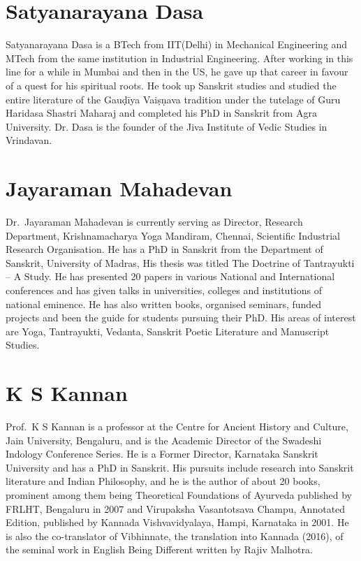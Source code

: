 \section*{Satyanarayana Dasa}

Satyanarayana Dasa is a BTech from IIT(Delhi) in Mechanical Engineering and MTech from the same institution in Industrial Engineering. After working in this line for a while in Mumbai and then in the US, he gave up that career in favour of a quest for his spiritual roots. He took up Sanskrit studies and studied the entire literature of the Gauḍīya Vaiṣṇava tradition under the tutelage of Guru Haridasa Shastri Maharaj and completed his PhD in Sanskrit from Agra University. Dr. Dasa is the founder of the Jiva Institute of Vedic Studies in Vrindavan. 

\section*{Jayaraman Mahadevan}

Dr.~Jayaraman Mahadevan is currently serving as Director, Research Department, Krishnamacharya Yoga Mandiram, Chennai, Scientific Industrial Research Organisation. He has a PhD in Sanskrit from the Department of Sanskrit, University of Madras, His thesis was titled The Doctrine of Tantrayukti – A Study. He has presented 20 papers in various National and International conferences and has given talks in universities, colleges and institutions of national eminence. He has also written books, organised seminars, funded projects and been the guide for students pursuing their PhD. His areas of interest are Yoga, Tantrayukti, Vedanta, Sanskrit Poetic Literature and Manuscript Studies.

\newpage


\section*{K S Kannan}

Prof.~K S Kannan is a professor at the Centre for Ancient History and Culture, Jain University, Bengaluru, and is the Academic Director of the Swadeshi Indology Conference Series. He is a Former Director, Karnataka Sanskrit University and has a PhD in Sanskrit. His pursuits include research into Sanskrit literature and Indian Philosophy, and he is the author of about 20 books, prominent among them being Theoretical Foundations of Ayurveda published by FRLHT, Bengaluru in 2007 and Virupaksha Vasantotsava Champu, Annotated Edition, published by Kannada Vishvavidyalaya, Hampi, Karnataka in 2001. He is also the co-translator of Vibhinnate, the translation into Kannada (2016), of the seminal work in English Being Different written by Rajiv Malhotra.

